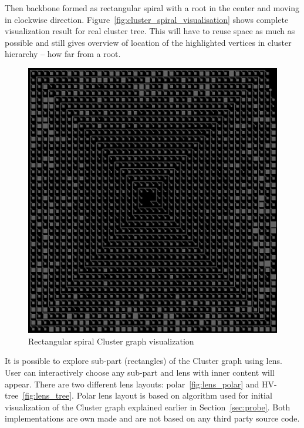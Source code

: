 Then backbone formed as rectangular spiral with a root in the center and moving in clockwise direction. Figure~\ref{fig:cluster_spiral_visualisation} shows complete visualization result for real cluster tree. This will have to reuse space as much as possible and still gives overview of location of the highlighted vertices in cluster hierarchy -- how far from a root.

\begin{figure}[h!]
\centering
\includegraphics[scale=0.4]{pictures/cluster_spiral_visualisation.png}
\caption{Rectangular spiral Cluster graph visualization}
\label{fig:cluster_visualisation}
\end{figure}

It is possible to explore sub-part (rectangles) of the Cluster graph using lens. User can interactively choose any sub-part and lens with inner content will appear. There are two different lens layouts: polar~\ref{fig:lens_polar} and HV-tree~\ref{fig:lens_tree}. Polar lens layout is based on algorithm used for initial visualization of the Cluster graph explained earlier in Section~\ref{sec:probe}. Both implementations are own made and are not based on any third party source code.

